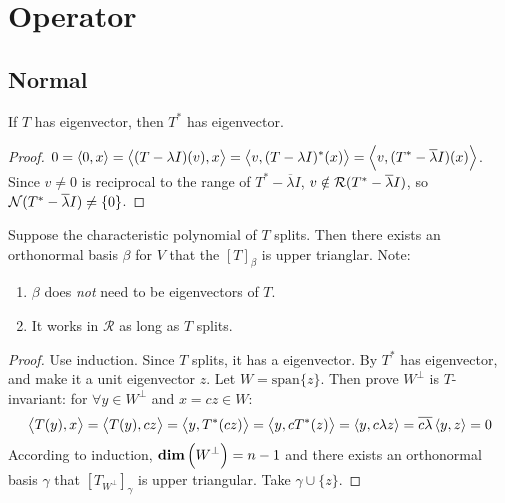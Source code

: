 \section{Operator}

\subsection{Normal}

\begin{theorem}\label{eigenvectorforadjointoperator}
    If $T$ has eigenvector, then $T^*$ has eigenvector.    
\end{theorem}
\begin{proof}
    $0 = \left\langle \displaystyle 0, x \right\rangle = \left\langle \displaystyle (T - \lambda I)(v), x \right\rangle = \left\langle \displaystyle v, (T - \lambda I)^* (x) \right\rangle = \left\langle \displaystyle v, (T^* - \overline{\lambda} I)(x) \right\rangle$. Since $v \neq 0$ is reciprocal to the range of $T^* - \overline{\lambda} I$, $v \notin \mathcal{R}(T^* - \overline{\lambda} I)$, so $\mathcal{N}(T^* - \overline{\lambda} I) \neq \{ 0 \}$.
\end{proof}

\begin{theorem}\label{schurincomplexfield}
    Suppose the characteristic polynomial of $T$ splits. Then there exists an orthonormal basis $\beta$ for $V$ that the $[T]_\beta$ is upper trianglar. Note:
    \begin{enumerate}
        \item $\beta$ does \emph{not} need to be eigenvectors of $T$.
        \item It works in $\mathcal{R}$ as long as $T$ splits.
    \end{enumerate} 
\end{theorem}
\begin{proof}
    Use induction. Since $T$ splits, it has a eigenvector. By  $T^*$ has eigenvector, and make it a unit eigenvector $z$. Let $W = \text{span}\{z\}$. Then prove $W^\bot$ is $T$-invariant: for $\forall y \in W^\bot$ and $x = cz \in W$:
    \begin{equation*}
        \begin{aligned}
            \left\langle \displaystyle T(y), x \right\rangle = \left\langle \displaystyle T(y), cz \right\rangle = \left\langle \displaystyle y, T^*(cz) \right\rangle = \left\langle \displaystyle y, cT^*(z) \right\rangle = \left\langle \displaystyle y, c \lambda z \right\rangle = \overline{c\lambda} \left\langle \displaystyle y, z \right\rangle = 0
        \end{aligned}
    \end{equation*}
    According to induction, $\displaystyle \mathbf{dim}\left( W^\bot \right) = n - 1$ and there exists an orthonormal basis $\gamma$ that $[T_{W^\bot}]_\gamma$ is upper triangular. Take $\gamma \cup \{z \}$.
\end{proof}

